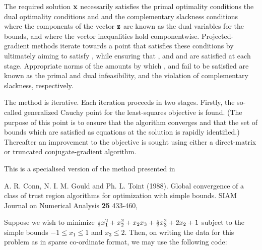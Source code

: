 \documentclass{galahad}
\begin{document}

\galmethod
The required solution ${\mathbf{x}}$ necessarily satisfies
the primal optimality conditions
the dual optimality conditions
and
and the complementary slackness conditions
where the components of the vector ${\mathbf{z}}$ are known as
the dual variables for the bounds,
and where the vector inequalities hold componentwise.
Projected-gradient methods iterate towards a point
that satisfies these conditions by ultimately aiming to satisfy
, while ensuring that
, and  and  are satisfied at each stage.
Appropriate norms of the amounts by
which ,  and  fail to be satisfied are known as the
primal and dual infeasibility, and the violation of complementary slackness,
respectively.

The method is iterative. Each iteration proceeds in two stages.
Firstly, the so-called generalized Cauchy point for the least-squares
objective is found.  (The purpose of this point is to ensure that the
algorithm converges and that the set of bounds which are satisfied as
equations at the solution is rapidly identified.)  Thereafter an
improvement to the objective is sought using either a
direct-matrix or truncated conjugate-gradient algorithm.

\vspace*{1mm}

\galreferences
\vspace*{1mm}

\noindent
This is a specialised version of the method presented in
\vspace*{1mm}

\noindent
A. R. Conn, N. I. M. Gould and Ph. L. Toint (1988).
Global convergence of a class of trust region algorithms
for optimization with simple bounds.
SIAM Journal on Numerical Analysis {\bf 25} 433-460,


\galexample
Suppose we wish to minimize
${\scriptstyle \frac{1}{2}} x_1^2 + x_2^2 + x_2 x_3 + {\scriptstyle \frac{3}{2}} x_3^2 + 2 x_2 + 1$
subject to the simple bounds
$-1  \leq  x_{1}  \leq  1$ and $x_{3}  \leq  2$.
Then, on writing the data for this problem as
in sparse co-ordinate format, we may use the following code:
\end{document}

